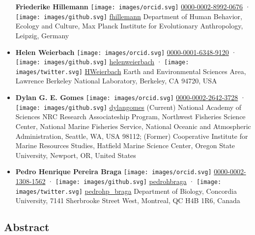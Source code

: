 \begin{itemize}
  \textbf{Friederike Hillemann}
  \texttt{[image: images/orcid.svg]}
  \href{https://orcid.org/0000-0002-8992-0676}{0000-0002-8992-0676}
  · \texttt{[image: images/github.svg]}
  \href{https://github.com/fhillemann}{fhillemann}
  Department of Human Behavior, Ecology and Culture, Max Planck Institute for Evolutionary Anthropology, Leipzig, Germany
\item
  \textbf{Helen Weierbach}
  \texttt{[image: images/orcid.svg]}
  \href{https://orcid.org/0000-0001-6348-9120}{0000-0001-6348-9120}
  · \texttt{[image: images/github.svg]}
  \href{https://github.com/helenweierbach}{helenweierbach}
  · \texttt{[image: images/twitter.svg]}
  \href{https://twitter.com/HWeierbach}{HWeierbach}
  Earth and Environmental Sciences Area, Lawrence Berkeley National Laboratory, Berkeley, CA 94720, USA
\item
  \textbf{Dylan G. E. Gomes}
  \texttt{[image: images/orcid.svg]}
  \href{https://orcid.org/0000-0002-2642-3728}{0000-0002-2642-3728}
  · \texttt{[image: images/github.svg]}
  \href{https://github.com/dylangomes}{dylangomes}
  (Current) National Academy of Sciences NRC Research Associateship Program, Northwest Fisheries Science Center, National Marine Fisheries Service, National Oceanic and Atmospheric Administration, Seattle, WA, USA 98112; (Former) Cooperative Institute for Marine Resources Studies, Hatfield Marine Science Center, Oregon State University, Newport, OR, United States
\item
  \textbf{Pedro Henrique Pereira Braga}
  \texttt{[image: images/orcid.svg]}
  \href{https://orcid.org/0000-0002-1308-1562}{0000-0002-1308-1562}
  · \texttt{[image: images/github.svg]}
  \href{https://github.com/pedrohbraga}{pedrohbraga}
  · \texttt{[image: images/twitter.svg]}
  \href{https://twitter.com/pedrohp_braga}{pedrohp\_braga}
  Department of Biology, Concordia University, 7141 Sherbrooke Street West, Montreal, QC H4B 1R6, Canada
\end{itemize}

\hypertarget{abstract}{%
\subsection{Abstract}\label{abstract}}

